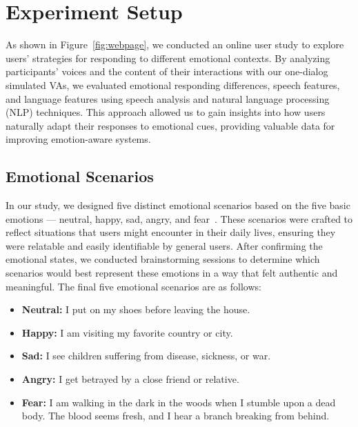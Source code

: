 \section{Experiment Setup}
As shown in Figure~\ref{fig:webpage}, we conducted an online user study to explore users' strategies for responding to different emotional contexts. By analyzing participants' voices and the content of their interactions with our one-dialog simulated VAs, we evaluated emotional responding differences, speech features, and language features using speech analysis and natural language processing (NLP) techniques. This approach allowed us to gain insights into how users naturally adapt their responses to emotional cues, providing valuable data for improving emotion-aware systems.

\subsection{Emotional Scenarios}
In our study, we designed five distinct emotional scenarios based on the five basic emotions — neutral, happy, sad, angry, and fear~\cite{ortony1990s,ortony2022all,ma2022emotion}. These scenarios were crafted to reflect situations that users might encounter in their daily lives, ensuring they were relatable and easily identifiable by general users. After confirming the emotional states, we conducted brainstorming sessions to determine which scenarios would best represent these emotions in a way that felt authentic and meaningful. The final five emotional scenarios are as follows:

\begin{itemize}
    \item \textbf{Neutral:} I put on my shoes before leaving the house.
    \item \textbf{Happy:} I am visiting my favorite country or city.
    \item \textbf{Sad:} I see children suffering from disease, sickness, or war.
    \item \textbf{Angry:} I get betrayed by a close friend or relative.
    \item \textbf{Fear:} I am walking in the dark in the woods when I stumble upon a dead body. The blood seems fresh, and I hear a branch breaking from behind.
\end{itemize}

